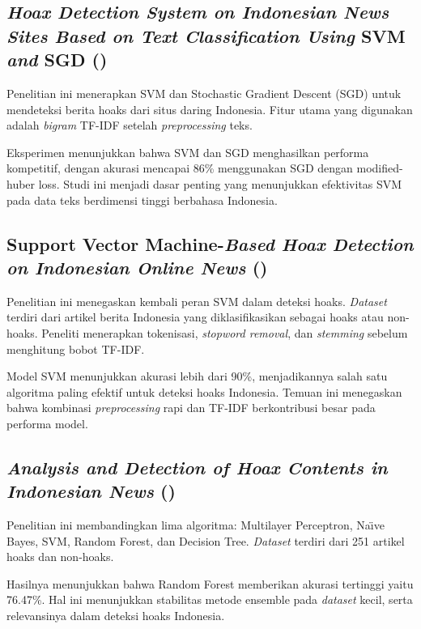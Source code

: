 \subsection{\textit{Hoax Detection System on Indonesian News Sites Based on Text Classification Using} SVM \textit{and} SGD (\textcite{prasetijo2017hoax})}

Penelitian ini menerapkan SVM dan Stochastic Gradient Descent (SGD) untuk mendeteksi berita hoaks dari situs daring Indonesia. Fitur utama yang digunakan adalah \textit{bigram} TF-IDF setelah \textit{preprocessing} teks.

Eksperimen menunjukkan bahwa SVM dan SGD menghasilkan performa kompetitif, dengan akurasi mencapai 86\% menggunakan SGD dengan modified-huber loss. Studi ini menjadi dasar penting yang menunjukkan efektivitas SVM pada data teks berdimensi tinggi berbahasa Indonesia.

\subsection{Support Vector Machine-\textit{Based Hoax Detection on Indonesian Online News} (\textcite{sihombing2020article})}

Penelitian ini menegaskan kembali peran SVM dalam deteksi hoaks. \textit{Dataset} terdiri dari artikel berita Indonesia yang diklasifikasikan sebagai hoaks atau non-hoaks. Peneliti menerapkan tokenisasi, \textit{stopword removal}, dan \textit{stemming} sebelum menghitung bobot TF-IDF.

Model SVM menunjukkan akurasi lebih dari 90\%, menjadikannya salah satu algoritma paling efektif untuk deteksi hoaks Indonesia. Temuan ini menegaskan bahwa kombinasi \textit{preprocessing} rapi dan TF-IDF berkontribusi besar pada performa model.

\subsection{\textit{Analysis and Detection of Hoax Contents in Indonesian News} (\textcite{putri2019analysis})}

Penelitian ini membandingkan lima algoritma: Multilayer Perceptron, Na\"{\i}ve Bayes, SVM, Random Forest, dan Decision Tree. \textit{Dataset} terdiri dari 251 artikel hoaks dan non-hoaks.

Hasilnya menunjukkan bahwa Random Forest memberikan akurasi tertinggi yaitu 76.47\%. Hal ini menunjukkan stabilitas metode ensemble pada \textit{dataset} kecil, serta relevansinya dalam deteksi hoaks Indonesia.

